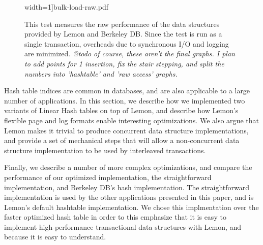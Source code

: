 \documentclass[letterpaper,twocolumn,english]{article}
\newcommand{\yad}{Lemon\xspace}
\begin{document}
\begin{figure}
   width=1\columnwidth]{bulk-load-raw.pdf}
\caption{\label{fig:BULK_LOAD} This test measures the raw performance
of the data structures provided by \yad and Berkeley DB.  Since the
test is run as a single transaction, overheads due to synchronous I/O
and logging are minimized.
{\em @todo of course, these aren't the final graphs.  I plan to add points for 1 insertion, fix
the stair stepping, and split the numbers into 'hashtable' and 'raw
access' graphs.}}
\end{figure}


%

Hash table indices are common in databases, and are also applicable to
a large number of applications.  In this section, we describe how we
implemented two variants of Linear Hash tables on top of \yad, and
describe how \yad's flexible page and log formats enable interesting
optimizations.  We also argue that \yad makes it trivial to produce
concurrent data structure implementations, and provide a set of
mechanical steps that will allow a non-concurrent data structure
implementation to be used by interleaved transactions.

Finally, we describe a number of more complex optimizations, and
compare the performance of our optimized implementation, the
straightforward implementation, and Berkeley DB's hash implementation.
The straightforward implementation is used by the other applications
presented in this paper, and is \yad's default hashtable
implementation.  We chose this implmentation over the faster optimized
hash table in order to this emphasize that it is easy to implement
high-performance transactional data structures with \yad, and because
it is easy to understand.
\end{document}
